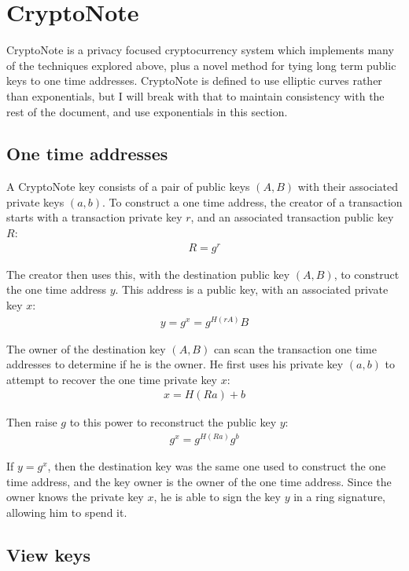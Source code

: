 \documentclass{article}
\begin{document}
\section{CryptoNote}

CryptoNote is a privacy focused cryptocurrency system which implements many of the techniques explored above, plus a novel method for tying long term public keys to one time addresses.  CryptoNote is defined to use elliptic curves rather than exponentials, but I will break with that to maintain consistency with the rest of the document, and use exponentials in this section.


\subsection{One time addresses}

A CryptoNote key consists of a pair of public keys $(A, B)$ with their associated private keys $(a, b)$.  To construct a one time address, the creator of a transaction starts with a transaction private key $r$, and an associated transaction public key $R$:
\begin{eqnarray}
  R=g^r
\end{eqnarray}

The creator then uses this, with the destination public key $(A, B)$, to construct the one time address $y$.  This address is a public key, with an associated private key $x$:
\begin{eqnarray}
  y = g^x = g^{H(rA)} B
\end{eqnarray}

The owner of the destination key $(A, B)$ can scan the transaction one time addresses to determine if he is the owner.  He first uses his private key $(a, b)$ to attempt to recover the one time private key $x$:
\begin{eqnarray}
	x = H(Ra) + b
\end{eqnarray}

Then raise $g$ to this power to reconstruct the public key $y$:
\begin{eqnarray}
  g^x = g^{H(Ra)} g^b
\end{eqnarray}

If $y = g^x$, then the destination key was the same one used to construct the one time address, and the key owner is the owner of the one time address.  Since the owner knows the private key $x$, he is able to sign the key $y$ in a ring signature, allowing him to spend it.


\subsection{View keys}
\end{document}
